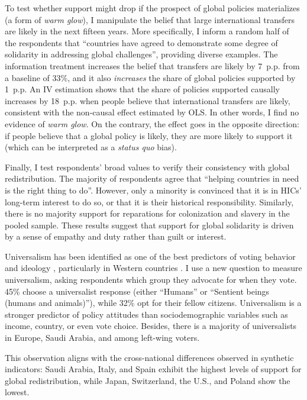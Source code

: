 \documentclass[12pt,english]{article}
\begin{document}
\begin{bibunit}
To test whether support might drop if the prospect of global policies materializes (a form of \textit{warm glow}), I manipulate the belief that large international transfers are likely in the next fifteen years. More specifically, I inform a random half of the respondents that ``countries have agreed to demonstrate some degree of solidarity in addressing global challenges'', providing diverse examples. The information treatment increases the belief that transfers are likely by 7~p.p. from a baseline of 33\%, and it also \textit{increases} the share of global policies supported by 1~p.p. An IV estimation shows that the share of policies supported causally increases by 18~p.p. when people believe that international transfers are likely, consistent with the non-causal effect estimated by OLS. In other words, I find no evidence of \textit{warm glow}. On the contrary, the effect goes in the opposite direction: if people believe that a global policy is likely, they are more likely to support it (which can be interpreted as a \textit{status quo} bias).

Finally, I test respondents' broad values to verify their consistency with global redistribution. The majority of respondents agree that ``helping countries in need is the right thing to do''. However, only a minority is convinced that it is in HICs' long-term interest to do so, or that it is their historical responsibility. Similarly, there is no majority support for reparations for colonization and slavery in the pooled sample. These results suggest that support for global solidarity is driven by a sense of empathy and duty rather than guilt or interest. 

Universalism has been identified as one of the best predictors of voting behavior \citep{enke_moral_2020} and ideology \citep{enke_moral_2023,cappelen_universalism_2025},
particularly in Western countries \citep{cappelen_universalism_2025}.
I use a new question to measure universalism, asking respondents which group they advocate for when they vote. 45\% choose a universalist response (either ``Humans'' or ``Sentient beings (humans and animals)''), while 32\% opt for their fellow citizens. Universalism is a stronger predictor of policy attitudes than sociodemographic variables such as income, country, or even vote choice. Besides, there is a majority of universalists in Europe, Saudi Arabia, and among left-wing voters. 

This observation aligns with the cross-national differences observed in synthetic indicators: Saudi Arabia, Italy, and Spain exhibit the highest levels of support for global redistribution, while Japan, Switzerland, the U.S., and Poland show the lowest.


\end{bibunit}
\end{document}
